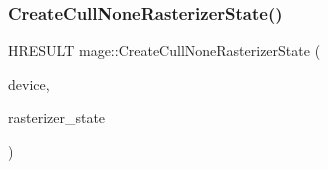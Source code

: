 \hypertarget{namespacemage_a7583853c115c9c5cecb583fa61157c25}{}\label{namespacemage_a7583853c115c9c5cecb583fa61157c25} 
\subsubsection{\texorpdfstring{Create\+Cull\+None\+Rasterizer\+State()}{CreateCullNoneRasterizerState()}}
{\footnotesize\ttfamily H\+R\+E\+S\+U\+LT mage\+::\+Create\+Cull\+None\+Rasterizer\+State (\begin{DoxyParamCaption}\item[{I\+D3\+D11\+Device2 $\ast$}]{device,  }\item[{I\+D3\+D11\+Rasterizer\+State $\ast$$\ast$}]{rasterizer\+\_\+state }\end{DoxyParamCaption})}

\hypertarget{namespacemage_a45746b9c8018b682c999fe1c5d4158db}{}\label{namespacemage_a45746b9c8018b682c999fe1c5d4158db} 
